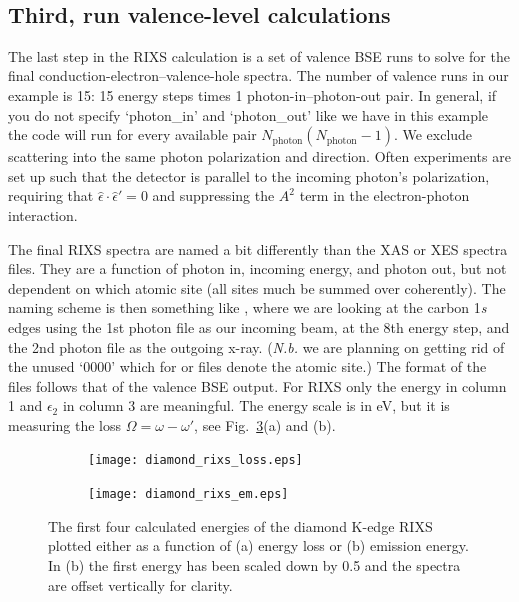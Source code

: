 \documentclass[11pt]{report}
\begin{document}
\

\subsection{Third, run valence-level calculations}

The last step in the RIXS calculation is a set of valence BSE runs to solve for the final conduction-electron--valence-hole spectra.
The number of valence runs in our example is 15: 15 energy steps times 1 photon-in--photon-out pair. 
In general, if you do not specify `photon\_in' and `photon\_out' like we have in this example the code will run for every available pair $N_\textrm{photon} (N_\textrm{photon} -1 )$. 
We exclude scattering into the same photon polarization and direction. 
Often experiments are set up such that the detector is parallel to the incoming photon's polarization, requiring that $\hat{\epsilon} \cdot \hat{\epsilon}' = 0$ and suppressing the $A^2$ term in the electron-photon interaction.

The final RIXS spectra are named a bit differently than the XAS or XES spectra files. 
They are a function of photon in, incoming energy, and photon out, but not dependent on which atomic site (all sites much be summed over coherently).
The naming scheme is then something like , where we are looking at the carbon 1{\it s} edges using the 1st photon file as our incoming beam, at the 8th energy step, and  the 2nd photon file as the outgoing x-ray. {(\it N.b.} we are planning on getting rid of the unused `0000' which for  or  files denote the atomic site.)
The format of the  files follows that of the valence BSE output. 
For RIXS only the energy in column 1 and $\epsilon_2$ in column 3 are meaningful.
The energy scale is in eV, but it is measuring the loss $\Omega = \omega - \omega'$, see Fig.~\ref{diamond_rixs}(a) and (b). 
\begin{figure}
\centering
\begin{subfigure}{.5\textwidth}
  \centering
  \texttt{[image: diamond\_rixs\_loss.eps]}
  \label{fig:sub1}
\end{subfigure}%
\begin{subfigure}{.5\textwidth}
  \centering
  \texttt{[image: diamond\_rixs\_em.eps]}
  \label{fig:sub2}
\end{subfigure}
\caption{The first four calculated energies of the diamond K-edge RIXS plotted either as a function of (a) energy loss or (b) emission energy. In (b) the first energy has been scaled down by 0.5 and the spectra are offset vertically for clarity.}
\label{diamond_rixs}
\end{figure}
\end{document}

